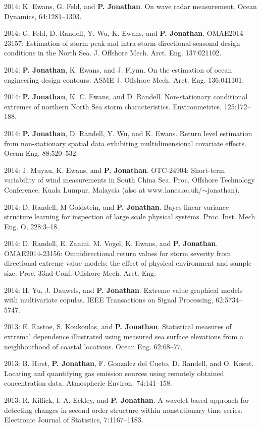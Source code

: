 \documentclass[11pt,a4paper]{moderncv}
\begin{document}
2014: K. Ewans, G. Feld, and \textbf{P. Jonathan}. On wave radar measurement. Ocean Dynamics, 64:1281--1303. 

2014: G. Feld, D. Randell, Y. Wu, K. Ewans, and \textbf{P. Jonathan}. OMAE2014-23157: Estimation of storm peak and intra-storm directional-seasonal design conditions in the North Sea. J. Offshore Mech. Arct. Eng. 137:021102.

2014: \textbf{P. Jonathan}, K. Ewans, and J. Flynn. On the estimation of ocean engineering design contours. ASME J. Offshore Mech. Arct. Eng. 136:041101.

2014: \textbf{P. Jonathan}, K. C. Ewans, and D. Randell. Non-stationary conditional extremes of northern North Sea storm characteristics. Environmetrics, 125:172--188.

2014: \textbf{P. Jonathan}, D. Randell, Y. Wu, and K. Ewans. Return level estimation from non-stationary spatial data exhibiting multidimensional covariate effects. Ocean Eng. 88:520--532.

2014: J. Muyau, K. Ewans, and \textbf{P. Jonathan}. OTC-24904: Short-term variability of wind measurements in South China Sea. Proc. Offshore Technology Conference, Kuala Lumpur, Malaysia (also at www.lancs.ac.uk/$\sim$jonathan).

2014: D. Randell, M Goldstein, and \textbf{P. Jonathan}. Bayes linear variance structure learning for inspection of large scale physical systems. Proc. Inst. Mech. Eng. O, 228:3--18.

2014: D. Randell, E. Zanini, M. Vogel, K. Ewans, and \textbf{P. Jonathan}. OMAE2014-23156: Omnidirectional return values for storm severity from directional extreme value models: the effect of physical environment and sample size. Proc. 33nd Conf. Offshore Mech. Arct. Eng.

2014: H. Yu, J. Dauwels, and \textbf{P. Jonathan}. Extreme value graphical models with multivariate copulas. IEEE Transactions on Signal Processing, 62:5734--5747.

2013: E. Eastoe, S. Koukoulas, and \textbf{P. Jonathan}. Statistical measures of extremal dependence illustrated using measured sea surface elevations from a neighbourhood of coastal locations. Ocean Eng. 62:68--77.

2013: B. Hirst, \textbf{P. Jonathan}, F. Gonzalez del Cueto, D. Randell, and O. Kosut. Locating and quantifying gas emission sources using remotely obtained concentration data. Atmospheric Environ. 74:141--158.

2013: R. Killick, I. A. Eckley, and \textbf{P. Jonathan}. A wavelet-based approach for detecting changes in second order structure within nonstationary time series. Electronic Journal of Statistics, 7:1167--1183.
\end{document}
